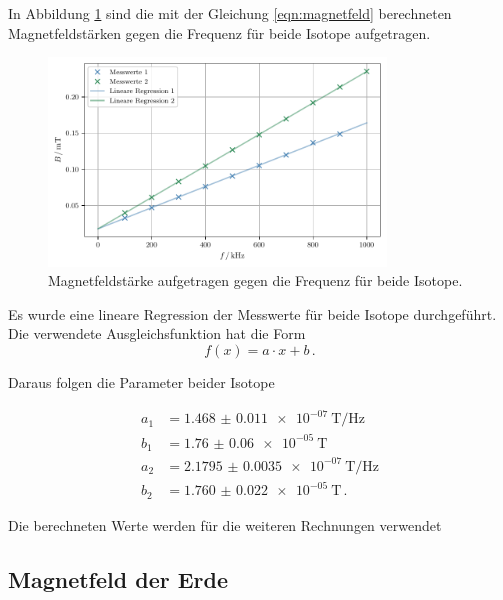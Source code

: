 In Abbildung \ref{fig:plot1} sind die mit der Gleichung \ref{eqn:magnetfeld} berechneten Magnetfeldstärken gegen die Frequenz für beide Isotope aufgetragen.

\begin{figure}
    \centering
    \includegraphics[width=0.8\textwidth]{build/plot.pdf}
    \caption{Magnetfeldstärke aufgetragen gegen die Frequenz für beide Isotope.}
    \label{fig:plot1}
\end{figure}

Es wurde eine lineare Regression der Messwerte für beide Isotope durchgeführt.
Die verwendete Ausgleichsfunktion hat die Form
\begin{equation}
    f(x) = a \cdot x + b \, .
\end{equation}

Daraus folgen die Parameter beider Isotope

\begin{align*}
    a_1 &= \qty{1.468(11)e-07}{\tesla\per\hertz} \\
    b_1 &= \qty{1.76(6)e-05}{\tesla} \\
    a_2 &= \qty{2.1795(35)e-07}{\tesla\per\hertz} \\
    b_2 &= \qty{1.760(22)e-05}{\tesla} \, .
\end{align*}

Die berechneten Werte werden für die weiteren Rechnungen verwendet

\subsection{Magnetfeld der Erde}
\label{sec:magnetfeld-der-erde}

